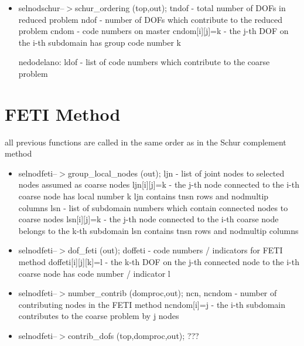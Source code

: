 \begin{itemize}
\item
selnodschur--$>$schur\_ordering (top,out);
tndof - total number of DOFs in reduced problem
ndof - number of DOFs which contribute to the reduced problem
cndom - code numbers on master
cndom[i][j]=k - the j-th DOF on the i-th subdomain has group code number k

nedodelano:
ldof - list of code numbers which contribute to the coarse problem




\end{itemize}


\section{FETI Method}

all previous functions are called in the same order as in the Schur complement method

\begin{itemize}
\item
selnodfeti--$>$group\_local\_nodes (out);
ljn - list of joint nodes to selected nodes assumed as coarse nodes
ljn[i][j]=k - the j-th node connected to the i-th coarse node has local number k
ljn contains tnsn rows and nodmultip columns
lsn - list of subdomain numbers which contain connected nodes to coarse nodes
lsn[i][j]=k - the j-th node connected to the i-th coarse node belongs to the k-th subdomain
lsn contains tnsn rows and nodmultip columns

\item
selnodfeti--$>$dof\_feti (out);
doffeti - code numbers / indicators for FETI method
doffeti[i][j][k]=l - the k-th DOF on the j-th connected node to the i-th coarse node has code number / indicator l
 
\item
selnodfeti--$>$number\_contrib (domproc,out);
ncn, ncndom - 
number of contributing nodes in the FETI method
ncndom[i]=j - the i-th subdomain contributes to the coarse problem by j nodes


\item
selnodfeti--$>$contrib\_dofs (top,domproc,out);
???

\end{itemize}
